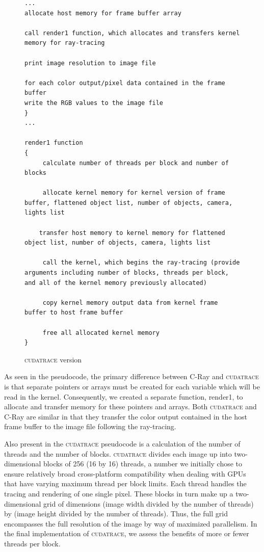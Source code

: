 \documentclass[12pt]{article}
\begin{document}
\begin{figure}
    \caption{\textsc{cudatrace} version} \label{code:cudatrace_basic}
\begin{lstlisting}
...
allocate host memory for frame buffer array

call render1 function, which allocates and transfers kernel memory for ray-tracing
 
print image resolution to image file

for each color output/pixel data contained in the frame buffer
write the RGB values to the image file
}
...

render1 function
{
     calculate number of threads per block and number of blocks
  
     allocate kernel memory for kernel version of frame buffer, flattened object list, number of objects, camera, lights list    
    
    transfer host memory to kernel memory for flattened object list, number of objects, camera, lights list

     call the kernel, which begins the ray-tracing (provide arguments including number of blocks, threads per block, and all of the kernel memory previously allocated)

     copy kernel memory output data from kernel frame buffer to host frame buffer

     free all allocated kernel memory
}  

\end{lstlisting}
\end{figure}

As seen in the pseudocode, the primary difference between C-Ray and \textsc{cudatrace} is that separate pointers or arrays must be created for each variable which will be read in the kernel. Consequently, we created a separate function, render1, to allocate and transfer memory for these pointers and arrays. Both \textsc{cudatrace} and C-Ray are similar in that they transfer the color output contained in the host frame buffer to the image file following the ray-tracing. 

Also present in the \textsc{cudatrace} pseudocode is a calculation of the number of threads and the number of blocks. \textsc{cudatrace} divides each image up into two-dimensional blocks of 256 (16 by 16) threads, a number we initially chose to ensure relatively broad cross-platform compatibility when dealing with GPUs that have varying maximum thread per block limits. Each thread handles the tracing and rendering of one single pixel. These blocks in turn make up a two-dimensional grid of dimensions (image width divided by the number of threads) by (image height divided by the number of threads). Thus, the full grid encompasses the full resolution of the image by way of maximized parallelism. In the final implementation of \textsc{cudatrace}, we assess the benefits of more or fewer threads per block.
\end{document}
